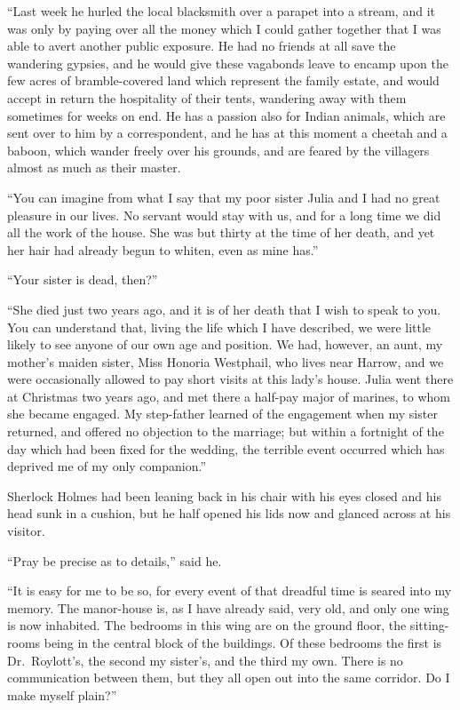 “Last week he hurled the local blacksmith over a parapet
into a stream, and it was only by paying over all the money
which I could gather together that I was able to avert another
public exposure. He had no friends at all save the wandering
gypsies, and he would give these vagabonds leave to encamp
upon the few acres of bramble-covered land which
represent the family estate, and would accept in return the
hospitality of their tents, wandering away with them sometimes
for weeks on end. He has a passion also for Indian
animals, which are sent over to him by a correspondent, and
he has at this moment a cheetah and a baboon, which wander
freely over his grounds, and are feared by the villagers almost
as much as their master.

“You can imagine from what I say that my poor sister
Julia and I had no great pleasure in our lives. No servant
would stay with us, and for a long time we did all the work of
the house. She was but thirty at the time of her death, and
yet her hair had already begun to whiten, even as mine has.”

“Your sister is dead, then?”

“She died just two years ago, and it is of her death that I
wish to speak to you. You can understand that, living the
life which I have described, we were little likely to see anyone
of our own age and position. We had, however, an aunt, my
mother’s maiden sister, Miss Honoria Westphail, who lives
near Harrow, and we were occasionally allowed to pay short
visits at this lady’s house. Julia went there at Christmas two
years ago, and met there a half-pay major of marines, to
whom she became engaged. My step-father learned of the
engagement when my sister returned, and offered no
objection to the marriage; but within a fortnight of the day which
had been fixed for the wedding, the terrible event occurred
which has deprived me of my only companion.”

Sherlock Holmes had been leaning back in his chair with
his eyes closed and his head sunk in a cushion, but he half
opened his lids now and glanced across at his visitor.

“Pray be precise as to details,” said he.

“It is easy for me to be so, for every event of that dreadful
time is seared into my memory. The manor-house is, as
I have already said, very old, and only one wing is now inhabited.
The bedrooms in this wing are on the ground floor,
the sitting-rooms being in the central block of the buildings.
Of these bedrooms the first is Dr.\ Roylott’s, the second my
sister’s, and the third my own. There is no communication
between them, but they all open out into the same corridor.
Do I make myself plain?”

